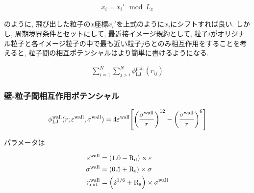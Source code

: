 \documentclass[dvipdfmx]{jsarticle}
\numberwithin{equation}{subsection}
\begin{document}
\begin{align}
  x_{i} = x_{i}' \mod L_{x}
\end{align}

のように,  飛び出した粒子の$x$座標$x_{i}'$を上式のように$x_i$にシフトすれば良い. しかし, 周期境界条件とセットにして, 最近接イメージ規約として, 粒子$i$がオリジナル粒子と各イメージ粒子の中で最も近い粒子$j$らとのみ相互作用をすることを考えると, 粒子間の相互ポテンシャルはより簡単に書けるようになる.

\begin{align}
  \sum_{i=1}^{N} \sum_{j > i}^{N} \phi_{\text{LJ}}^{\text{pair}} (r_{ij})
\end{align}










\subsubsection{壁-粒子間相互作用ポテンシャル}


\begin{align}
  \phi_{\text{LJ}}^{\text{wall}}(r; \varepsilon^{\text{wall}}, \sigma^{\text{wall}}) = 4\varepsilon^{\text{wall}} \qty[\qty(\frac{\sigma^{\text{wall}}}{r})^{12} - \qty(\frac{\sigma^{\text{wall}}}{r})^{6} ] \\
\end{align}

パラメータは

\begin{align}
  \varepsilon^{\text{wall}} &= \qty(1.0 - \text{R}_\text{d}) \times \varepsilon \\
  \sigma^{\text{wall}} &= \qty(0.5 + \text{R}_\text{t}) \times \sigma \\
  r^{\text{wall}}_{\text{cut}} &= \qty(2^{1/6} + \text{R}_\text{a}) \times \sigma^{\text{wall}}
\end{align}
\end{document}
